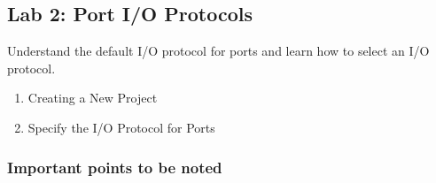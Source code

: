 \subsection{Lab 2: Port I/O Protocols}
Understand the default I/O protocol for ports and learn how to select an I/O protocol.

\begin{enumerate}[label=Step \arabic*:]
    \item Creating a New Project
    \item Specify the I/O Protocol for Ports
\end{enumerate}

\subsubsection{Important points to be noted}

